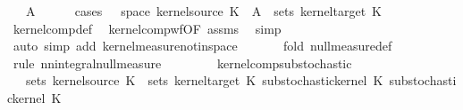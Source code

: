 \begin{isabellebody}
\ \ {\isasymomega}\ A{\isacharprime}{\kern0pt}\isanewline
\ \ \ \ \isamarkupfalse%
\ {\isacharparenleft}{\kern0pt}cases\ {\isachardoublequoteopen}{\isasymomega}\ {\isasymin}\ space\ {\isacharparenleft}{\kern0pt}kernel{\isacharunderscore}{\kern0pt}source\ K\ {\isasymand}\ A{\isacharprime}{\kern0pt}\ {\isasymin}\ sets\ {\isacharparenleft}{\kern0pt}kernel{\isacharunderscore}{\kern0pt}target\ K\isanewline
\ \ \ \ \isamarkupfalse%
\ kernel{\isacharunderscore}{\kern0pt}comp{\isacharunderscore}{\kern0pt}def\ \isamarkupfalse%
\ kernel{\isacharunderscore}{\kern0pt}comp{\isacharunderscore}{\kern0pt}wf{\isacharbrackleft}{\kern0pt}OF\ assms{\isacharbrackright}{\kern0pt}\ \isamarkupfalse%
\ simp\isanewline
\ \ \ \ \isamarkupfalse%
\ {\isacharparenleft}{\kern0pt}auto\ simp\ add{\isacharcolon}{\kern0pt}\ kernel{\isacharunderscore}{\kern0pt}measure{\isacharunderscore}{\kern0pt}notin{\isacharunderscore}{\kern0pt}space\ {\isacharparenright}{\kern0pt}\isanewline
\ \ \ \ \isamarkupfalse%
\ {\isacharparenleft}{\kern0pt}fold\ null{\isacharunderscore}{\kern0pt}measure{\isacharunderscore}{\kern0pt}def{\isacharparenright}{\kern0pt}\isanewline
\ \ \ \ \isamarkupfalse%
\ {\isacharparenleft}{\kern0pt}rule\ nn{\isacharunderscore}{\kern0pt}integral{\isacharunderscore}{\kern0pt}null{\isacharunderscore}{\kern0pt}measure{\isacharparenright}{\kern0pt}\isanewline
\ \ \ \ \isamarkupfalse%
\isanewline
\ \ \isamarkupfalse%
%
\endisatagproof
{\isafoldproof}%
%
\isadelimproof
\isanewline
%
\endisadelimproof
\isanewline
{}\isamarkupfalse%
\ kernel{\isacharunderscore}{\kern0pt}comp{\isacharunderscore}{\kern0pt}substochastic{\isacharcolon}{\kern0pt}\isanewline
\ \ \ {\isachardoublequoteopen}sets\ {\isacharparenleft}{\kern0pt}kernel{\isacharunderscore}{\kern0pt}source\ K\ {\isacharequal}{\kern0pt}\ sets\ {\isacharparenleft}{\kern0pt}kernel{\isacharunderscore}{\kern0pt}target\ K\ {\isachardoublequoteopen}substochastic{\isacharunderscore}{\kern0pt}kernel\ K\ {\isachardoublequoteopen}substochastic{\isacharunderscore}{\kern0pt}kernel\ K\isanewline

\end{isabellebody}
